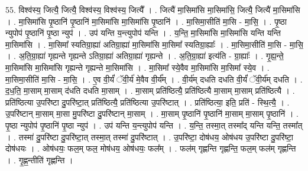 \documentclass[17pt]{extarticle}
\begin{document}
55. विश्व॑स्य॒ जित्यै॒ जित्यै॒ विश्व॑स्य॒ विश्व॑स्य॒ जित्यै᳚ । . जित्यै॑ मा॒सिमा॑सि मा॒सिमा॑सि॒ जित्यै॒ जित्यै॑ मा॒सिमा॑सि । . मा॒सिमा॑सि पृ॒ष्ठानि॑ पृ॒ष्ठानि॑ मा॒सिमा॑सि मा॒सिमा॑सि पृ॒ष्ठानि॑ । . मा॒सिमा॒सीति॑ मा॒सि - मा॒सि॒ । . पृ॒ष्ठा न्युपोप॑ पृ॒ष्ठानि॑ पृ॒ष्ठा न्युप॑ । . उप॑ यन्ति य॒न्त्युपोप॑ यन्ति । . य॒न्ति॒ मा॒सिमा॑सि मा॒सिमा॑सि यन्ति यन्ति मा॒सिमा॑सि । . मा॒सिमा᳚ स्यतिग्रा॒ह्या॑ अतिग्रा॒ह्या॑ मा॒सिमा॑सि मा॒सिमा᳚ स्यतिग्रा॒ह्याः᳚ । . मा॒सिमा॒सीति॑ मा॒सि - मा॒सि॒ । . अ॒ति॒ग्रा॒ह्या॑ गृह्यन्ते गृह्यन्ते ऽतिग्रा॒ह्या॑ अतिग्रा॒ह्या॑ गृह्यन्ते । . अ॒ति॒ग्रा॒ह्या॑ इत्य॑ति - ग्रा॒ह्याः᳚ । . गृ॒ह्य॒न्ते॒ मा॒सिमा॑सि मा॒सिमा॑सि गृह्यन्ते गृह्यन्ते मा॒सिमा॑सि । . मा॒सिमा᳚ स्ये॒वैव मा॒सिमा॑सि मा॒सिमा᳚ स्ये॒व । . मा॒सिमा॒सीति॑ मा॒सि - मा॒सि॒ । . ए॒व वी॒र्यं॑ ॅवी॒र्य॑ मे॒वैव वी॒र्य᳚म् । . वी॒र्य॑म् दधति दधति वी॒र्यं॑ ॅवी॒र्य॑म् दधति । . द॒ध॒ति॒ मा॒साम् मा॒साम् द॑धति दधति मा॒साम् । . मा॒साम् प्रति॑ष्ठित्यै॒ प्रति॑ष्ठित्यै मा॒साम् मा॒साम् प्रति॑ष्ठित्यै । . प्रति॑ष्ठित्या उ॒परि॑ष्टा दु॒परि॑ष्टा॒त् प्रति॑ष्ठित्यै॒ प्रति॑ष्ठित्या उ॒परि॑ष्टात् । . प्रति॑ष्ठित्या॒ इति॒ प्रति॑ - स्थि॒त्यै॒ । . उ॒परि॑ष्टान् मा॒साम् मा॒सा मु॒परि॑ष्टा दु॒परि॑ष्टान् मा॒साम् । . मा॒साम् पृ॒ष्ठानि॑ पृ॒ष्ठानि॑ मा॒साम् मा॒साम् पृ॒ष्ठानि॑ । . पृ॒ष्ठा न्युपोप॑ पृ॒ष्ठानि॑ पृ॒ष्ठा न्युप॑ । . उप॑ यन्ति य॒न्त्युपोप॑ यन्ति । . य॒न्ति॒ तस्मा॒त् तस्मा᳚द् यन्ति यन्ति॒ तस्मा᳚त् । . तस्मा॑ दु॒परि॑ष्टा दु॒परि॑ष्टा॒त् तस्मा॒त् तस्मा॑ दु॒परि॑ष्टात् । . उ॒परि॑ष्टा॒ दोष॑धय॒ ओष॑धय उ॒परि॑ष्टा दु॒परि॑ष्टा॒ दोष॑धयः । . ओष॑धयः॒ फल॒म् फल॒ मोष॑धय॒ ओष॑धयः॒ फल᳚म् । . फल॑म् गृह्णन्ति गृह्णन्ति॒ फल॒म् फल॑म् गृह्णन्ति । . गृ॒ह्ण॒न्तीति॑ गृह्णन्ति । \newline
\end{document}

